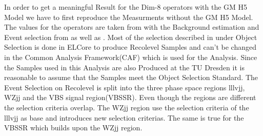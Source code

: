 \documentclass[../Bachelorarbeit.tex]{subfiles}
\begin{document}
\label{sec:Event_selection}
In order to get a meaningful Result for the Dim-8 operators with the GM H5 Model we have to first reproduce the Measurments
without the GM H5 Model. The values for the operators are taken from \cite{Need Source} with the Background estimation
and Event selection from \cite{Collaboration.2018} as well as \cite{Bittrich.27.05.2020}.
Most of the selection described in \cite{Bittrich.27.05.2020} under Object Selection is done in ELCore to produce Recolevel Samples and can't be changed
in the Common Analysis Framework(CAF) which is used for the Analysis. Since the Samples used in this Analysis are also
Produced at the TU Dresden it is reasonable to assume that the Samples meet the Object Selection Standard.
The Event Selection on Recolevel is split into the three phase space regions lllvjj, WZjj and the VBS signal region(VBSSR).
Even though the regions are different the selection criteria overlap. The WZjj region use the selection criteria of the lllvjj as base and introduces new selection criterias.
The same is true for the VBSSR which builds upon the WZjj region.
\end{document}
